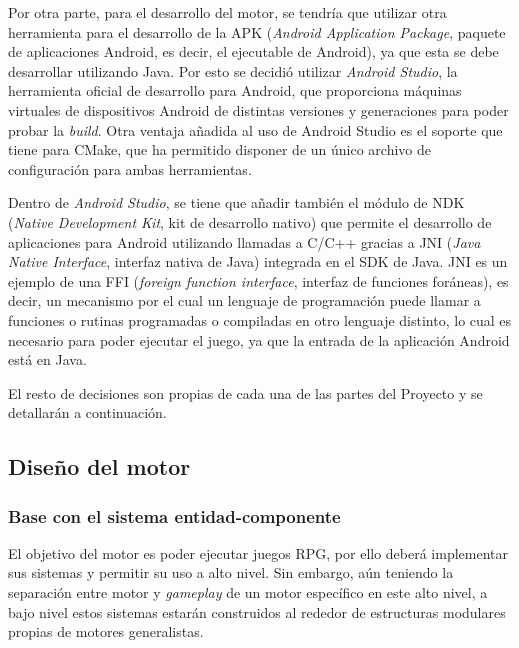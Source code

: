 \medskip

Por otra parte, para el desarrollo del motor, se tendría que utilizar otra herramienta para el desarrollo de la APK (\textit{Android Application Package}, paquete de aplicaciones Android, es decir, el ejecutable de Android), ya que esta se debe desarrollar utilizando Java. Por esto se decidió utilizar \textit{Android Studio}, la herramienta oficial de desarrollo para Android, que proporciona máquinas virtuales de dispositivos Android de distintas versiones y generaciones para poder probar la \textit{build}. Otra ventaja añadida al uso de Android Studio es el soporte que tiene para CMake, que ha permitido disponer de un único archivo de configuración para ambas herramientas.

\smallskip

Dentro de \textit{Android Studio}, se tiene que añadir también el módulo de NDK (\textit{Native Development Kit}, kit de desarrollo nativo) que permite el desarrollo de aplicaciones para Android utilizando llamadas a C/C++ gracias a JNI (\textit{Java Native Interface}, interfaz nativa de Java) integrada en el SDK de Java. JNI es un ejemplo de una FFI (\textit{foreign function interface}, interfaz de funciones foráneas), es decir, un mecanismo por el cual un lenguaje de programación puede llamar a funciones o rutinas programadas o compiladas en otro lenguaje distinto, lo cual es necesario para poder ejecutar el juego, ya que la entrada de la aplicación Android está en Java.

\medskip

El resto de decisiones son propias de cada una de las partes del Proyecto y se detallarán a continuación.

\subsection{Diseño del motor}
\subsubsection{Base con el sistema entidad-componente}
El objetivo del motor es poder ejecutar juegos RPG, por ello deberá implementar sus sistemas y permitir su uso a alto nivel. Sin embargo, aún teniendo la separación entre motor y \textit{gameplay} de un motor específico en este alto nivel, a bajo nivel estos sistemas estarán construidos al rededor de estructuras modulares propias de motores generalistas.

\medskip  

